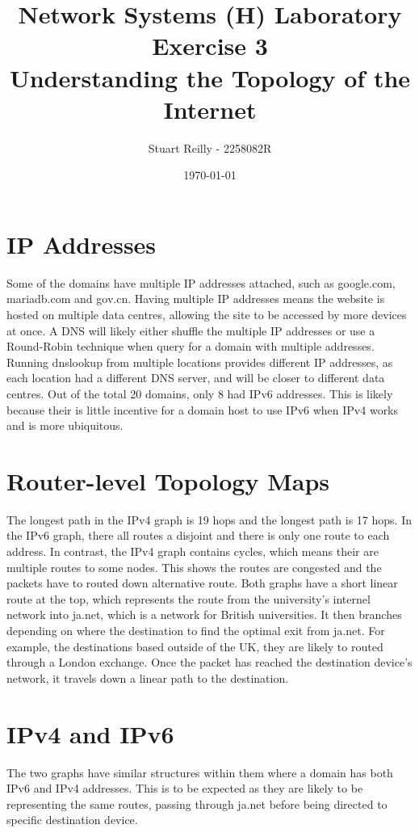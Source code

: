 \documentclass[10pt,a4paper]{article}
\begin{document}
    \title{Network Systems (H) Laboratory Exercise 3\\Understanding the Topology of the Internet}
    \author{Stuart Reilly - 2258082R}
    \date{\today}
    \maketitle

    \section{IP Addresses}\label{sec:ip-addresses}
    Some of the domains have multiple IP addresses attached, such as google.com, mariadb.com and gov.cn.
    Having multiple IP addresses means the website is hosted on multiple data centres, allowing the site to be accessed
    by more devices at once.
    A DNS will likely either shuffle the multiple IP addresses or use a Round-Robin technique when query for a domain
    with multiple addresses.
    Running dnslookup from multiple locations provides different IP addresses, as each location had a different DNS
    server, and will be closer to different data centres.
    Out of the total 20 domains, only 8 had IPv6 addresses.
    This is likely because their is little incentive for a domain host to use IPv6 when IPv4 works and is more ubiquitous.

    \section{Router-level Topology Maps}\label{sec:router-level-topology-maps}
    The longest path in the IPv4 graph is 19 hops and the longest path is 17 hops.
    In the IPv6 graph, there all routes a disjoint and there is only one route to each address.
    In contrast, the IPv4 graph contains cycles, which means their are multiple routes to some nodes.
    This shows the routes are congested and the packets have to routed down alternative route.
    Both graphs have a short linear route at the top, which represents the route from the university's internel network
    into ja.net, which is a network for British universities.
    It then branches depending on where the destination to find the optimal exit from ja.net.
    For example, the destinations based outside of the UK, they are likely to routed through a London exchange.
    Once the packet has reached the destination device's network, it travels down a linear path to the destination.

    \section{IPv4 and IPv6}\label{sec:ipv4-and-ipv6}
    The two graphs have similar structures within them where a domain has both IPv6 and IPv4 addresses.
    This is to be expected as they are likely to be representing the same routes, passing through ja.net before being
    directed to specific destination device.
\end{document}

